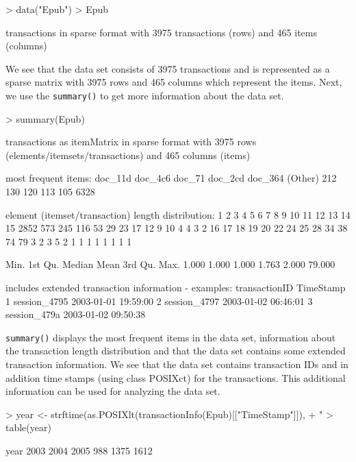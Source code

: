 \documentclass[10pt,a4paper]{article}
\newcommand{\class}[1]{\mbox{\textsf{#1}}}
\newcommand{\func}[1]{\mbox{\texttt{#1()}}}
\begin{document}
\begin{Schunk}
\begin{Sinput}
> data("Epub")
> Epub
\end{Sinput}
\begin{Soutput}
transactions in sparse format with
 3975 transactions (rows) and
 465 items (columns)
\end{Soutput}
\end{Schunk}

We see that the data set consists of 3975 transactions
and is represented as a sparse matrix with 3975 rows
and 465 columns which represent the items. 
Next, we use the \func{summary} to get more information about the 
data set.

\begin{Schunk}
\begin{Sinput}
> summary(Epub)
\end{Sinput}
\begin{Soutput}
transactions as itemMatrix in sparse format with
 3975 rows (elements/itemsets/transactions) and
 465 columns (items)

most frequent items:
doc_11d doc_4c6  doc_71 doc_2cd doc_364 (Other) 
    212     130     120     113     105    6328 

element (itemset/transaction) length distribution:
   1    2    3    4    5    6    7    8    9   10   11   12   13   14   15 
2852  573  245  116   53   29   23   17   12    9   10    4    4    3    2 
  16   17   18   19   20   22   24   25   28   34   38   74   79 
   3    2    3    5    2    1    1    1    1    1    1    1    1 

   Min. 1st Qu.  Median    Mean 3rd Qu.    Max. 
  1.000   1.000   1.000   1.763   2.000  79.000 

includes extended transaction information - examples:
  transactionID           TimeStamp
1  session_4795 2003-01-01 19:59:00
2  session_4797 2003-01-02 06:46:01
3  session_479a 2003-01-02 09:50:38
\end{Soutput}
\end{Schunk}

\func{summary} displays the most frequent items in the data set,
information about the transaction length distribution and that the data
set contains some extended transaction information.  We see that the
data set contains transaction IDs and in addition time stamps (using
class \class{POSIXct}) for the transactions.  This additional
information can be used for analyzing the data set.

\begin{Schunk}
\begin{Sinput}
> year <- strftime(as.POSIXlt(transactionInfo(Epub)[["TimeStamp"]]), 
+     "%
> table(year)
\end{Sinput}
\begin{Soutput}
year
2003 2004 2005 
 988 1375 1612 
\end{Soutput}
\end{Schunk}
\end{document}
